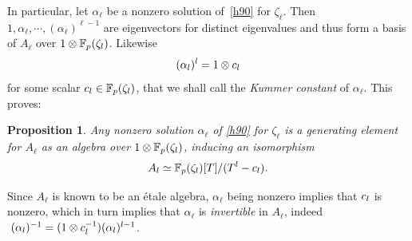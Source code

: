 \documentclass[sigconf]{acmart}
\newtheorem{proposition}[theorem]{Proposition}
\begin{document}
In particular, let $\alpha_\ell$ be a nonzero solution of~\eqref{h90} for $\zeta_\ell$.
Then $1,\alpha_\ell,\cdots,(\alpha_\ell)^{\ell-1}$ are eigenvectors for distinct eigenvalues and thus
form a basis of $A_\ell$ over $1\otimes\mathbb{F}_{p}(\zeta_{l})$.
Likewise
\[ (\alpha_l)^l = 1\otimes c_l \]
for some scalar $c_l\in\mathbb{F}_{p}(\zeta_l)$,
that we shall call the \emph{Kummer constant} of $\alpha_\ell$.
This proves:
\begin{proposition}
\label{alphagen}
Any nonzero solution $\alpha_\ell$ of \eqref{h90} for $\zeta_\ell$ is a generating element for $A_\ell$ as an algebra over $1\otimes\mathbb{F}_{p}(\zeta_{l})$,
inducing an isomorphism
\[ A_l\simeq \mathbb{F}_{p}(\zeta_{l})[T]/(T^l-c_l). \]
\end{proposition}

Since $A_\ell$ is known to be an \'etale algebra, 
$\alpha_\ell$ being nonzero implies that $c_l$ is nonzero, which in turn implies
that $\alpha_\ell$ is \emph{invertible} in $A_\ell$, indeed $\;(\alpha_l)^{-1} = (1\otimes c_l^{-1})(\alpha_l)^{l-1}$.

\end{document}
